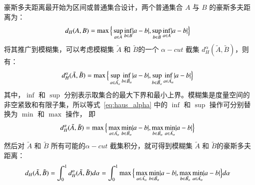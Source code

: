 \begin{enumerate}[(1)]
          豪斯多夫距离最开始为区间或普通集合设计，两个普通集合 $A$ 与 $B$ 的豪斯多夫距离为：
          \begin{equation} \label{eq:haus1}
              d_H(A, B) = \max \Big  \lbrace \sup_{a \in A} \inf_{b \in B} \lvert a-b\rvert, \sup_{b \in B} \inf_{a \in A} \lvert a-b\rvert \Big  \rbrace
          \end{equation}
          将其推广到模糊集，可以考虑模糊集 $\tilde{A}$ 和 $\tilde{B}$的一个 $\alpha-cut$ 截集  \cite{zadeh1965fuzzy} $d_H^{\alpha} (\tilde{A}, \tilde{B})$，则有：
          \begin{equation}\label{eq:haus_alpha}
              \begin{split}
                  d_H^{\alpha} (\tilde{A}, \tilde{B}) = \max \Big \lbrace \sup_{a \in \tilde{A_{\alpha}}} \inf_{b \in \tilde{B_{\alpha}}} \lvert a-b\rvert, \sup_{b \in \tilde{B_{\alpha}}} \inf_{a \in \tilde{A_{\alpha}}}
                  \lvert a-b\rvert \Big \rbrace
              \end{split}
          \end{equation}
          其中，$\inf$ 和 $\sup$ 分别表示取集合的最大下界和最小上界。模糊集是度量空间的非空紧致和有限子集，所以等式~\ref{eq:haus_alpha} 中的 $\inf$ 和 $\sup$ 操作可分别替换为 $\min$ 和 $\max$ 操作， 即
          \begin{equation}\label{eq:haus_alpha2}
              \begin{split}
                  d_H^{\alpha} (\tilde{A}, \tilde{B}) = \max \Big \lbrace \max_{a \in \tilde{A_{\alpha}}} \min_{b \in \tilde{B_{\alpha}}} \lvert a-b\rvert, \max_{b \in \tilde{B_{\alpha}}} \min_{a \in \tilde{A_{\alpha}}} \lvert a-b\rvert \Big \rbrace
              \end{split}
          \end{equation}
          然后对 $\tilde{A}$ 和 $\tilde{B}$ 所有可能的$\alpha-cut$ 截集积分，就可得到模糊集 $\tilde{A}$ 和 $\tilde{B}$的豪斯多夫距离：
          \begin{equation}\label{eq:haus2}
              \begin{split}
                  d_H(\tilde{A}, \tilde{B}) = \int_0 ^1 d_H^{\alpha} (\tilde{A}, \tilde{B}) d \alpha = \int_0 ^1 \max \Big \lbrace \max_{a \in \tilde{A_{\alpha}}} \min_{b \in \tilde{B_{\alpha}}} \lvert a-b\rvert, \max_{b \in \tilde{B_{\alpha}}} \min_{a \in \tilde{A_{\alpha}}} \lvert a-b\rvert \Big \rbrace  d \alpha
              \end{split}
          \end{equation}

\end{enumerate}



